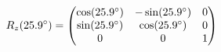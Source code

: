 \documentclass[preview]{standalone}
\begin{document}
\begin{align*}
\special{dvisvgm:raw <g id='unique000'>}R_z(25.9^\circ) = \begin{pmatrix} \cos(25.9^\circ) & -\sin(25.9^\circ) & 0 \\ \sin(25.9^\circ) & \cos(25.9^\circ) & 0 \\ 0 & 0 & 1 \end{pmatrix}\special{dvisvgm:raw </g>}
\end{align*}
\end{document}
